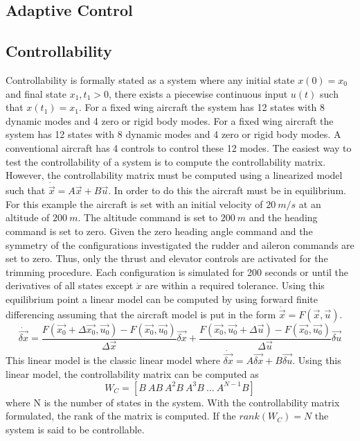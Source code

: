 \subsection{Adaptive Control}

\subsection{Controllability}

Controllability is formally stated as a system where any initial
state $x(0)=x_0$ and final state $x_1,t_1>0$, there exists a piecewise
continuous input $u(t)$ such that $x(t_1)=x_1$. 
For a fixed wing aircraft the system has 12 states with 8 dynamic
modes and 4 zero or rigid body modes. For a fixed wing aircraft the system has 12 states with 8 dynamic
modes and 4 zero or rigid body modes. A conventional aircraft has 4
controls to control these 12 modes. The easiest way to test the 
controllability of a system  is to compute the
controllability matrix. However, the controllability matrix must be
computed using a linearized model such that
$\dot{\vec{x}}=A\vec{x}+B\vec{u}$. In order to do this the aircraft
must be in equilibrium. For this example the aircraft is
set with an initial velocity of $20~m/s$ at an altitude of
$200~m$. The altitude command is set to $200~m$ and the heading
command is set to zero. Given the zero heading angle command and the
symmetry of the configurations investigated the rudder and aileron
commands are set to zero. Thus, only the thrust and elevator controls
are activated for the trimming procedure. Each configuration is
simulated for 200 seconds or until the derivatives of all states
except $\dot{x}$ are within a required tolerance. Using this
equilibrium point a linear model can be computed by using forward
finite differencing assuming that the
aircraft model is put in the form $\dot{\vec{x}} = F(\vec{x},\vec{u})$.
\begin{equation}
\dot{\vec{\delta x}} = \frac{F(\vec{x_0}+\Delta \vec{x_0},\vec{u_0})-F(\vec{x_0},\vec{u_0})}{\Delta
  \vec{x}}\vec{\delta x} + \frac{F(\vec{x_0},\vec{u_0}+\Delta
  \vec{u})-F(\vec{x_0},\vec{u_0})}{\Delta \vec{u}}\vec{\delta u}
\end{equation}
This linear model is the classic linear model where
$\dot{\vec{\delta x}}=A\vec{\delta{x}}+B\vec{\delta{u}}$. Using this linear model, the
controllability matrix can be computed as
\begin{equation}
W_C = [B~AB~A^2B~A^3B~...~A^{N-1}B]
\end{equation}
where N is the number of states in the system. With the controllability
matrix formulated, the rank of the matrix is computed. If the
$rank(W_C)=N$ the system is said to be controllable.

